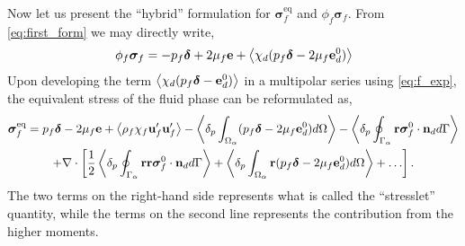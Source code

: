 Now let us present the ``hybrid'' formulation for $\bm\sigma_f^\text{eq}$ and $\phi_f\bm{\sigma}_f$.  
From \ref{eq:first_form} we may directly write, 
\begin{equation}
    \phi_f\bm\sigma_f
    = 
    - p_f \bm\delta + 2 \mu_f \textbf{e}
    +\left<\chi_d ( p_f\bm\delta - 2 \mu_f\textbf{e}_d^0)\right> 
\end{equation}
Upon developing the term $\left<\chi_d ( p_f\bm\delta - \textbf{e}_d^0)\right>$ in a multipolar series using \ref{eq:f_exp}, the equivalent stress of the fluid phase can be reformulated as, 
\begin{multline}
    \bm{\sigma}^\text{eq}_f = 
    p_f \bm\delta 
    - 2\mu_f \textbf{e} 
    +\avg{\rho_f\chi_f\textbf{u}_f'\textbf{u}_f'} 
    - \pOavg{(p_f\bm\delta - 2\mu_f\textbf{e}_d^0)}
    - \pSavg{\textbf{r}\bm{\sigma}_f^0\cdot \textbf{n}_d}
    \\
    + \div \left[
        \frac{1}{2} \pSavg{\textbf{rr}\bm{\sigma}_f^0\cdot \textbf{n}_d}
        + \pOavg{ \textbf{r}(p_f\bm\delta - 2\mu_f\textbf{e}_d^0) }
        + \ldots
    \right].
    \label{eq:sigma_eq_hybrid}
\end{multline} 
The two terms on the right-hand side represents what is called the ``stresslet'' quantity, while the terms on the second line represents the contribution from the higher moments. 


